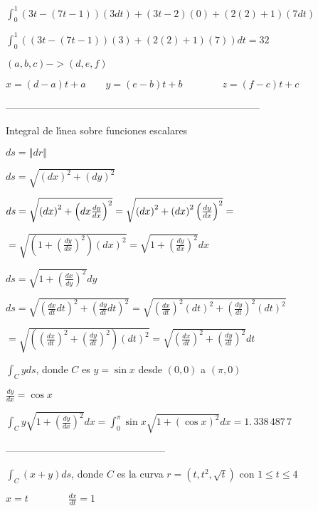 \documentclass{article}
\begin{document}
$\int_{0}^{1}\left( \allowbreak 3t-\left( 7t-1\right) \right) \left(
3dt\right) +\left( \allowbreak 3t-2\right) \left( 0\right) +\left( 2\left(
2\right) +1\right) \left( 7dt\right) $

$\int_{0}^{1}\left( \left( \allowbreak 3t-\left( 7t-1\right) \right) \left(
3\right) +\left( 2\left( 2\right) +1\right) \left( 7\right) \right)
dt=\allowbreak 32$

$\left( a,b,c\right) ->\left( d,e,f\right) $

$x=\left( d-a\right) t+a\qquad y=\left( e-b\right) t+b\qquad \qquad z=\left(
f-c\right) t+c$

-----------------------------------------------------------------------------

Integral de l\'{\i}nea sobre funciones escalares

$ds=\left\Vert dr\right\Vert $

$ds=\sqrt{\left( dx\right) ^{2}+\left( dy\right) ^{2}}$

$ds=\sqrt{\left( dx\right) ^{2}+\left( dx\frac{dy}{dx}\right) ^{2}}=\sqrt{%
\left( dx\right) ^{2}+\left( dx\right) ^{2}\left( \frac{dy}{dx}\right) ^{2}}=
$

$=\sqrt{\left( 1+\left( \frac{dy}{dx}\right) ^{2}\right) \left( dx\right)
^{2}}=\sqrt{1+\left( \frac{dy}{dx}\right) ^{2}}dx$

$ds=\sqrt{1+\left( \frac{dx}{dy}\right) ^{2}}dy$

$ds=\sqrt{\left( \frac{dx}{dt}dt\right) ^{2}+\left( \frac{dy}{dt}dt\right)
^{2}}=\sqrt{\left( \frac{dx}{dt}\right) ^{2}\left( dt\right) ^{2}+\left( 
\frac{dy}{dt}\right) ^{2}\left( dt\right) ^{2}}$

$=\sqrt{\left( \left( \frac{dx}{dt}\right) ^{2}+\left( \frac{dy}{dt}\right)
^{2}\right) \left( dt\right) ^{2}}=\sqrt{\left( \frac{dx}{dt}\right)
^{2}+\left( \frac{dy}{dt}\right) ^{2}}dt$

$\int_{C}yds$, donde $C$ es $y=\sin x$ desde $\left( 0,0\right) $ a $\left(
\pi ,0\right) $

$\frac{dy}{dx}=\cos x$

$\int_{C}y\sqrt{1+\left( \frac{dy}{dx}\right) ^{2}}dx=\int_{0}^{\pi }\sin x%
\sqrt{1+\left( \cos x\right) ^{2}}dx=\allowbreak 1.\,\allowbreak
338\,487\,7\allowbreak $

------------------------------------------------

$\int_{C}\left( x+y\right) ds$, donde $C$ es la curva $r=\left( t,t^{2},%
\sqrt{t}\right) $ con $1\leq t\leq 4$

$x=t\qquad \qquad \frac{dx}{dt}=1\qquad \qquad $
\end{document}
